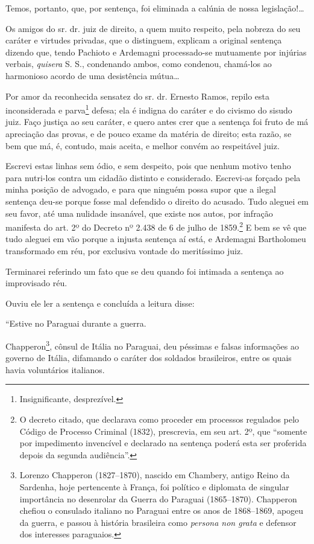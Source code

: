 Temos, portanto, que, por sentença, foi eliminada a calúnia de nossa
legislação!\ldots{}

Os amigos do sr. dr. juiz de direito, a quem muito respeito, pela
nobreza do seu caráter e virtudes privadas, que o distinguem, explicam a
original sentença dizendo que, tendo Pachioto e Ardemagni processado-se
mutuamente por injúrias verbais, \emph{quisera} S. S., condenando ambos,
como condenou, chamá-los ao harmonioso acordo de uma desistência
mútua\ldots{}

Por amor da reconhecida sensatez do sr. dr. Ernesto Ramos, repilo esta
inconsiderada e parva\footnote{ Insignificante, desprezível.} defesa;
ela é indigna do caráter e do civismo do sisudo juiz. Faço justiça ao
seu caráter, e quero antes crer que a sentença foi fruto de má
apreciação das provas, e de pouco exame da matéria de direito; esta
razão, se bem que má, é, contudo, mais aceita, e melhor convém ao
respeitável juiz.

Escrevi estas linhas sem ódio, e sem despeito, pois que nenhum motivo
tenho para nutri-los contra um cidadão distinto e considerado.
Escrevi-as forçado pela minha posição de advogado, e para que ninguém
possa supor que a ilegal sentença deu-se porque fosse mal defendido o
direito do acusado. Tudo aleguei em seu favor, até uma nulidade
insanável, que existe nos autos, por infração manifesta do art. 2º do
Decreto nº 2.438 de 6 de julho de 1859.\footnote{ O decreto citado, que
  declarava como proceder em processos regulados pelo Código de Processo
  Criminal (1832), prescrevia, em seu art. 2º, que ``somente por
  impedimento invencível e declarado na sentença poderá esta ser
  proferida depois da segunda audiência''.} E bem se vê que tudo aleguei
em vão porque a injusta sentença aí está, e Ardemagni Bartholomeu
transformado em réu, por exclusiva vontade do meritíssimo juiz.

Terminarei referindo um fato que se deu quando foi intimada a sentença
ao improvisado réu.

Ouviu ele ler a sentença e concluída a leitura disse:

``Estive no Paraguai durante a guerra.

Chapperon\footnote{ Lorenzo Chapperon (1827--1870), nascido em Chambery,
  antigo Reino da Sardenha, hoje pertencente à França, foi político e
  diplomata de singular importância no desenrolar da Guerra do Paraguai
  (1865--1870). Chapperon chefiou o consulado italiano no Paraguai entre
  os anos de 1868--1869, apogeu da guerra, e passou à história brasileira
  como \emph{persona non grata} e defensor dos interesses paraguaios.},
cônsul de Itália no Paraguai, deu péssimas e falsas informações ao
governo de Itália, difamando o caráter dos soldados brasileiros, entre
os quais havia voluntários italianos.

